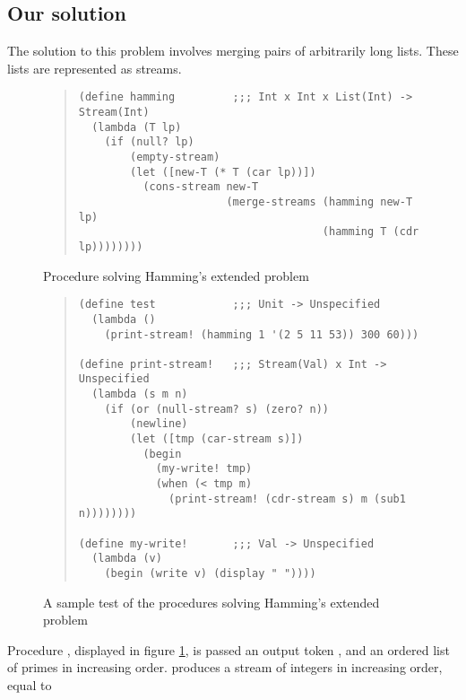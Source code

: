 \subsection{Our solution}

The solution to this problem involves merging pairs of arbitrarily
long lists.  These lists are represented as streams.

\begin{figure}%
\begin{frameit}
\begin{quote}
\begin{verbatim}
(define hamming         ;;; Int x Int x List(Int) -> Stream(Int)
  (lambda (T lp)
    (if (null? lp)
        (empty-stream)
        (let ([new-T (* T (car lp))])
          (cons-stream new-T
                       (merge-streams (hamming new-T lp)
                                      (hamming T (cdr lp))))))))
\end{verbatim}
\end{quote}
\caption{Procedure solving Hamming's extended problem
}
\label{fig:hamm-sol}
\end{frameit}
\end{figure}
\begin{figure}%
\begin{frameit}
\begin{quote}
\begin{verbatim}
(define test            ;;; Unit -> Unspecified
  (lambda ()
    (print-stream! (hamming 1 '(2 5 11 53)) 300 60)))

(define print-stream!   ;;; Stream(Val) x Int -> Unspecified
  (lambda (s m n)
    (if (or (null-stream? s) (zero? n))
        (newline)
        (let ([tmp (car-stream s)])
          (begin
            (my-write! tmp)
            (when (< tmp m)
              (print-stream! (cdr-stream s) m (sub1 n))))))))

(define my-write!       ;;; Val -> Unspecified
  (lambda (v)
    (begin (write v) (display " "))))
\end{verbatim}
\end{quote}
\caption{A sample test of the procedures solving Hamming's extended problem
}
\label{fig:hamm-test}
\end{frameit}
\end{figure}

Procedure , displayed in figure \ref{fig:hamm-sol}, is
passed an output token , and an ordered list of
primes  in increasing order.   produces a stream
of integers in increasing order, equal to

